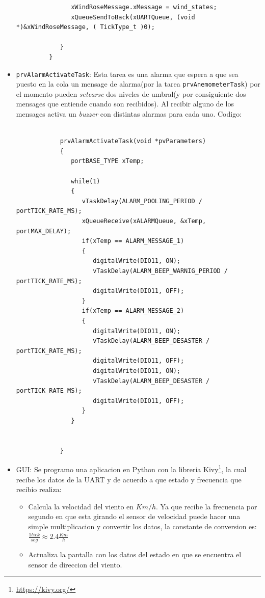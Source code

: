 \documentclass[10pt]{article}
\begin{document}
\begin{itemize}
\begin{verbatim}
               xWindRoseMessage.xMessage = wind_states;
               xQueueSendToBack(xUARTQueue, (void *)&xWindRoseMessage, ( TickType_t )0);

            }
         }
      \end{verbatim}
   \item \verb|prvAlarmActivateTask|: Esta tarea es una alarma que espera a que sea puesto en la cola un mensage de alarma(por la tarea \verb|prvAnemometerTask|) por el momento pueden \textit{setearse} dos niveles de umbral(y por consiguiente dos mensages que entiende cuando son recibidos). Al recibir alguno de los mensages activa un \textit{buzzer} con distintas alarmas para cada uno. Codigo:
      \begin{verbatim}
         
            prvAlarmActivateTask(void *pvParameters)
            {
               portBASE_TYPE xTemp;

               while(1)
               {
                  vTaskDelay(ALARM_POOLING_PERIOD / portTICK_RATE_MS);
                  xQueueReceive(xALARMQueue, &xTemp,  portMAX_DELAY);
                  if(xTemp == ALARM_MESSAGE_1)
                  {
                     digitalWrite(DIO11, ON);
                     vTaskDelay(ALARM_BEEP_WARNIG_PERIOD / portTICK_RATE_MS);
                     digitalWrite(DIO11, OFF);
                  }
                  if(xTemp == ALARM_MESSAGE_2)
                  {
                     digitalWrite(DIO11, ON);
                     vTaskDelay(ALARM_BEEP_DESASTER / portTICK_RATE_MS);
                     digitalWrite(DIO11, OFF);
                     digitalWrite(DIO11, ON);
                     vTaskDelay(ALARM_BEEP_DESASTER / portTICK_RATE_MS);
                     digitalWrite(DIO11, OFF);
                  }
               }


            }
      \end{verbatim}
   \item GUI: Se programo una aplicacion en Python con la libreria Kivy\footnote{\url{https://kivy.org/}}, la cual recibe los datos de la UART y de acuerdo a que estado y frecuencia que recibio realiza:
      \begin{itemize}
         \item Calcula la velocidad del viento en $Km/h$. Ya que recibe la frecuencia por segundo en que esta girando el sensor de velocidad puede hacer una simple multiplicacion y convertir los datos, la constante de conversion es: $\frac{1 tick}{seg} \approx 2.4 \frac{Km}{h}$
         \item Actualiza la pantalla con los datos del estado en que se encuentra el sensor de direccion del viento.
      \end{itemize}
\end{itemize}
\end{document}
